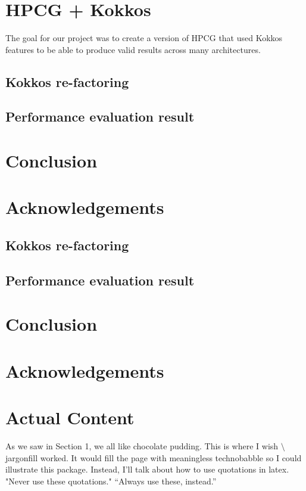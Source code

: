 \documentclass{ccr15}
\begin{document}
\section{HPCG + Kokkos}
The goal for our project was to create a version of HPCG that used Kokkos features to be able to
produce valid results across many architectures.
\subsection{Kokkos re-factoring}
\subsection{Performance evaluation result}
\section{Conclusion}
\section{Acknowledgements}
\subsection{Kokkos re-factoring}

\subsection{Performance evaluation result}

\section{Conclusion}

\section{Acknowledgements}

\section{Actual Content}
As we saw in Section 1, we all like chocolate pudding. This is where I wish
\textsf{$\setminus$jargonfill} worked. It would fill the page with meaningless technobabble so I could illustrate this
package. Instead, I'll talk about how to use quotations in latex. "Never use these quotations." ``Always use these,
instead.''
\end{document}
